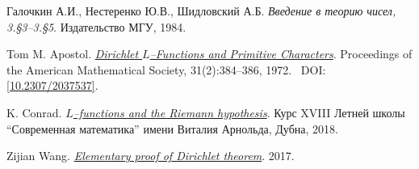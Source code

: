 \thispagestyle{supplementary}

\begin{thebibliography}{4}
        Галочкин А.И., Нестеренко Ю.В., Шидловский А.Б. 
        \textit{Введение в теорию чисел, 3.\S3--3.\S5}. 
        Издательство МГУ, 1984.

        Tom M. Apostol. 
        \href{https://www.jstor.org/stable/2037537}{\textit{Dirichlet $L$--Functions and Primitive Characters}}. 
        Proceedings of the American Mathematical Society, 31(2):384--386, 1972.~\newline
        DOI: \href{https://doi.org/10.2307/2037537}{[10.2307/2037537]}.

        K. Conrad. 
        \href{https://www.mccme.ru/dubna/2018/notes/kconrad-notes.pdf}{\textit{$L$--functions and the Riemann hypothesis}}. 
        Курс XVIII Летней школы ``Современная математика'' имени Виталия Арнольда, Дубна, 2018.

        Zijian Wang. 
        \href{https://math.uchicago.edu/~may/REU2017/REUPapers/WangZijian.pdf}{\textit{Elementary proof of Dirichlet theorem}}. 
        2017.
\end{thebibliography}
